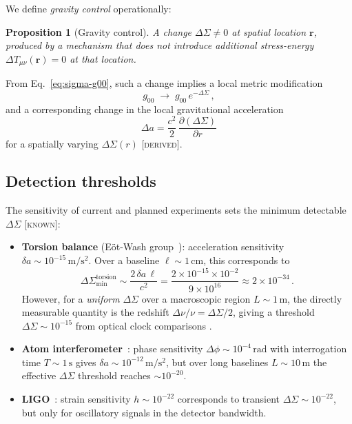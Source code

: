\documentclass[prd,twocolumn,superscriptaddress,longbibliography,floatfix]{revtex4-2}
\newtheorem*{proposition}{Proposition}
\newcommand{\DSigma}{\Delta\Sigma}
\newcommand{\known}{\textsc{[known]}}
\newcommand{\derived}{\textsc{[derived]}}
\begin{document}
We define \emph{gravity control} operationally:

\begin{proposition}[Gravity control]
A change $\DSigma \neq 0$ at spatial location $\bm{r}$, produced
by a mechanism that does not introduce additional stress-energy
$\Delta T_{\mu\nu}(\bm{r}) = 0$ at that location.
\end{proposition}

\noindent From Eq.~\eqref{eq:sigma-g00}, such a change implies a
local metric modification
\begin{equation}
  g_{00} \;\to\; g_{00}\,e^{-\DSigma}\,,
  \label{eq:metric-shift}
\end{equation}
and a corresponding change in the local gravitational acceleration
\begin{equation}
  \Delta a = \frac{c^2}{2}\,\frac{\partial(\DSigma)}{\partial r}
  \label{eq:accel-shift}
\end{equation}
for a spatially varying $\DSigma(r)$ \derived.

\subsection{Detection thresholds}

The sensitivity of current and planned experiments sets the minimum
detectable $\DSigma$ \known:

\begin{itemize}
  \item \textbf{Torsion balance} (E\"ot-Wash
    group~\cite{Adelberger2009}): acceleration sensitivity
    $\delta a \sim 10^{-15}\,\mathrm{m/s^2}$.  Over a baseline
    $\ell \sim 1\,\mathrm{cm}$, this corresponds to
    \begin{equation}
      \DSigma_{\min}^{\mathrm{torsion}} \sim
      \frac{2\,\delta a\,\ell}{c^2}
      = \frac{2 \times 10^{-15} \times 10^{-2}}{9 \times 10^{16}}
      \approx 2 \times 10^{-34}\,.
      \label{eq:torsion-threshold}
    \end{equation}
    However, for a \emph{uniform} $\DSigma$ over a macroscopic region
    $L \sim 1\,\mathrm{m}$, the directly measurable quantity is
    the redshift $\Delta\nu/\nu = \DSigma/2$, giving a threshold
    $\DSigma \sim 10^{-15}$ from optical clock comparisons
    \cite{Bothwell2022}.
  \item \textbf{Atom interferometer}~\cite{Asenbaum2020}:
    phase sensitivity $\Delta\phi \sim 10^{-4}\,\mathrm{rad}$ with
    interrogation time $T \sim 1\,\mathrm{s}$ gives
    $\delta a \sim 10^{-12}\,\mathrm{m/s^2}$, but over long baselines
    $L \sim 10\,\mathrm{m}$ the effective $\DSigma$ threshold reaches
    $\sim 10^{-20}$.
  \item \textbf{LIGO}~\cite{LIGOScientific2015}: strain sensitivity
    $h \sim 10^{-22}$ corresponds to transient $\DSigma \sim 10^{-22}$,
    but only for oscillatory signals in the detector bandwidth.
\end{itemize}
\end{document}

